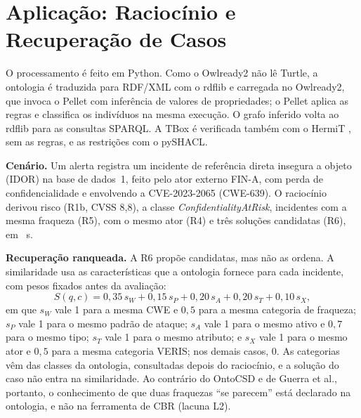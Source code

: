 \documentclass[12pt]{article}
\begin{document}
\section{Aplicação: Raciocínio e Recuperação de Casos}
\label{sec:app}

O processamento é feito em Python. Como o Owlready2 \cite{owlready} não lê Turtle, a ontologia é traduzida para RDF/XML com o rdflib e carregada no Owlready2, que invoca o Pellet \cite{pellet} com inferência de valores de propriedades; o Pellet aplica as regras e classifica os indivíduos na mesma execução. O grafo inferido volta ao rdflib para as consultas SPARQL. A TBox é verificada também com o HermiT \cite{hermit}, sem as regras, e as restrições com o pySHACL.

\textbf{Cenário.} Um alerta registra um incidente de referência direta insegura a objeto (IDOR) na base de dados~1, feito pelo ator externo FIN-A, com perda de confidencialidade e envolvendo a CVE-2023-2065 (CWE-639). O raciocínio derivou risco \emph{\scenRisk} (R1b, CVSS 8,8), a classe \emph{ConfidentialityAtRisk}, \scenSharesW{} incidentes com a mesma fraqueza (R5), \scenSharesA{} com o mesmo ator (R4) e três soluções candidatas (R6), em \scenSec{}~s.

\textbf{Recuperação ranqueada.} A R6 propõe candidatas, mas não as ordena. A similaridade usa as características que a ontologia fornece para cada incidente, com pesos fixados antes da avaliação:
\begin{equation}
S(q,c) = 0{,}35\,s_{W} + 0{,}15\,s_{P} + 0{,}20\,s_{A} + 0{,}20\,s_{T} + 0{,}10\,s_{X},
\end{equation}
em que $s_W$ vale 1 para a mesma CWE e $0{,}5$ para a mesma categoria de fraqueza; $s_P$ vale 1 para o mesmo padrão de ataque; $s_A$ vale 1 para o mesmo ativo e $0{,}7$ para o mesmo tipo; $s_T$ vale 1 para o mesmo atributo; e $s_X$ vale 1 para o mesmo ator e $0{,}5$ para a mesma categoria VERIS; nos demais casos, 0. As categorias vêm das classes da ontologia, consultadas depois do raciocínio, e a solução do caso não entra na similaridade. Ao contrário do OntoCSD e de Guerra et al., portanto, o conhecimento de que duas fraquezas ``se parecem'' está declarado na ontologia, e não na ferramenta de CBR (lacuna L2).

\begin{table}[ht]
\centering\small
\caption{Cinco casos mais semelhantes ao incidente do cenário.}
\label{tab:cenario}

\end{table}
\end{document}
